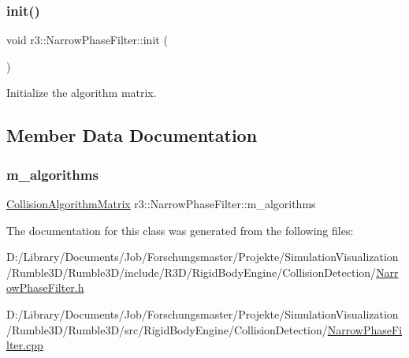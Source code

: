 \subsubsection{\texorpdfstring{init()}{init()}}
{\footnotesize\ttfamily void r3\+::\+Narrow\+Phase\+Filter\+::init (\begin{DoxyParamCaption}{ }\end{DoxyParamCaption})\hspace{0.3cm}{\ttfamily [protected]}}



Initialize the algorithm matrix. 



\subsection{Member Data Documentation}
\mbox{\label{classr3_1_1_narrow_phase_filter_a476cf750e3cd55d9e36a011eb0c447af}} 
\subsubsection{\texorpdfstring{m\+\_\+algorithms}{m\_algorithms}}
{\footnotesize\ttfamily \mbox{\hyperlink{classr3_1_1_collision_algorithm_matrix}{Collision\+Algorithm\+Matrix}} r3\+::\+Narrow\+Phase\+Filter\+::m\+\_\+algorithms\hspace{0.3cm}{\ttfamily [protected]}}



The documentation for this class was generated from the following files\+:\begin{DoxyCompactItemize}
\item 
D\+:/\+Library/\+Documents/\+Job/\+Forschungsmaster/\+Projekte/\+Simulation\+Visualization/\+Rumble3\+D/\+Rumble3\+D/include/\+R3\+D/\+Rigid\+Body\+Engine/\+Collision\+Detection/\mbox{\hyperlink{_narrow_phase_filter_8h}{Narrow\+Phase\+Filter.\+h}}\item 
D\+:/\+Library/\+Documents/\+Job/\+Forschungsmaster/\+Projekte/\+Simulation\+Visualization/\+Rumble3\+D/\+Rumble3\+D/src/\+Rigid\+Body\+Engine/\+Collision\+Detection/\mbox{\hyperlink{_narrow_phase_filter_8cpp}{Narrow\+Phase\+Filter.\+cpp}}\end{DoxyCompactItemize}
